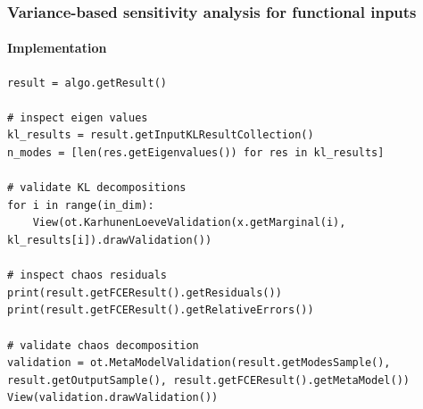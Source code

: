 \documentclass[aspectratio=169]{beamer}
\begin{document}
\begin{frame}[containsverbatim]
\frametitle{Variance-based sensitivity analysis for functional inputs}

\framesubtitle{Implementation}

\lstset{language=python}
\begin{lstlisting}
result = algo.getResult()

# inspect eigen values
kl_results = result.getInputKLResultCollection()
n_modes = [len(res.getEigenvalues()) for res in kl_results]

# validate KL decompositions
for i in range(in_dim):
    View(ot.KarhunenLoeveValidation(x.getMarginal(i), kl_results[i]).drawValidation())

# inspect chaos residuals
print(result.getFCEResult().getResiduals())
print(result.getFCEResult().getRelativeErrors())

# validate chaos decomposition
validation = ot.MetaModelValidation(result.getModesSample(), result.getOutputSample(), result.getFCEResult().getMetaModel())
View(validation.drawValidation())

\end{lstlisting}

\end{frame}
\end{document}
